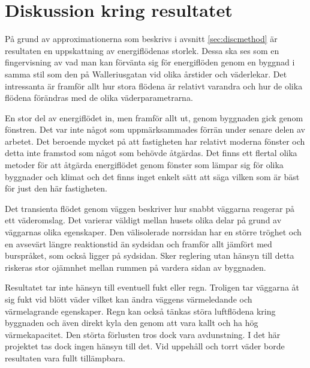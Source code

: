 \section{Diskussion kring resultatet}


På grund av approximationerna som beskrivs i avsnitt \ref{sec:discmethod} är resultaten en uppskattning av energiflödenas storlek. Dessa ska ses som en fingervisning av vad man kan förvänta sig för energiflöden genom en byggnad i samma stil som den på Walleriusgatan vid olika årstider och väderlekar. Det intressanta är framför allt hur stora flödena är relativt varandra och hur de olika flödena förändras med de olika väderparametrarna.

En stor del av energiflödet in, men framför allt ut, genom byggnaden gick genom fönstren. Det var inte något som uppmärksammades förrän under senare delen av arbetet. Det beroende mycket på att fastigheten har relativt moderna fönster och detta inte framstod som något som behövde åtgärdas. Det finns ett flertal olika metoder för att åtgärda energiflödet genom fönster som lämpar sig för olika byggnader och klimat och det finns inget enkelt sätt att säga vilken som är bäst för just den här fastigheten.

Det transienta flödet genom väggen beskriver hur snabbt väggarna reagerar på ett väderomslag. Det varierar väldigt mellan husets olika delar på grund av väggarnas olika egenskaper. Den välisolerade norrsidan har en större tröghet och en avsevärt längre reaktionstid än sydsidan och framför allt jämfört med burspråket, som också ligger på sydsidan. Sker reglering utan hänsyn till detta riskeras stor ojämnhet mellan rummen på vardera sidan av byggnaden.

Resultatet tar inte hänsyn till eventuell fukt eller regn. Troligen tar väggarna åt sig fukt vid blött väder vilket kan ändra väggens värmeledande och värmelagrande egenskaper. Regn kan också tänkas störa luftflödena kring byggnaden och även direkt kyla den genom att vara kallt och ha hög värmekapacitet. Den störta förlusten tros dock vara avdunstning. I det här projektet tas dock ingen hänsyn till det. Vid uppehåll och torrt väder borde resultaten vara fullt tillämpbara.

